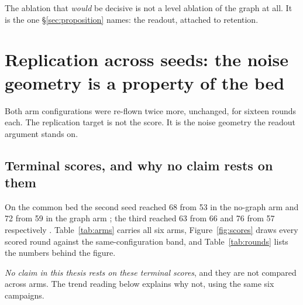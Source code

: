 The ablation that \emph{would} be decisive is not a level ablation of the
graph at all. It is the one \S\ref{sec:proposition} names: the readout,
attached to retention.

\section{Replication across seeds: the noise geometry is a property of the
bed}
\label{sec:replication}

Both arm configurations were re-flown twice more, unchanged, for sixteen
rounds each. The replication target is not the score. It is the noise
geometry the readout argument stands on.

\subsection*{Terminal scores, and why no claim rests on them}

On the common bed the second seed reached 68 from 53 in the no-graph arm
and 72 from 59 in the graph arm ; the third reached 63 from 66 and
76 from 57 respectively . Table~\ref{tab:arms} carries all six arms,
Figure~\ref{fig:scores} draws every scored round against the
same-configuration band, and Table~\ref{tab:rounds} lists the numbers
behind the figure.

\emph{No claim in this thesis rests on these terminal scores}, and they are
not compared across arms. The trend reading below explains why not,
using the same six campaigns.


